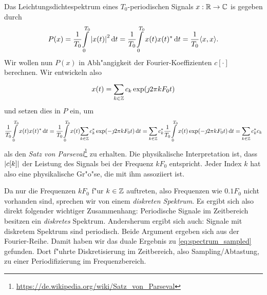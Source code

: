 Das Leichtungsdichtespektrum eines $T_0$-periodischen Signals $x: \mathbb{R} \rightarrow \mathbb{C}$ is gegeben durch
\begin{equation}\label{eq:fourier:period_psd}
P(x) = \frac{1}{T_0}{\int\limits_{0}^{T_0}{{\left| x(t) \right|}^2}\,\mathrm{d}{t}}
     = \frac{1}{T_0}{\int\limits_{0}^{T_0}{x(t) x(t)^\ast}\,\mathrm{d}{t}}
     = \frac{1}{T_0} {\left\langle x,x \right\rangle}.
\end{equation}
Wir wollen nun $P(x)$ in Abh"angigkeit der Fourier-Koeffizienten $c[\cdot]$ berechnen.
Wir entwickeln also
\[
x(t) = {\sum\limits_{k \in \mathbb{Z}}^{}{
    c_k \exp(\jmath 2 \pi k F_0 t)
}}
\]
und setzen dies in $P$ ein, um
\[
\frac{1}{T_0}{\int\limits_{0}^{T_0}{x(t) x(t)^\ast}\,\mathrm{d}{t}}
    = \frac{1}{T_0}{\int\limits_{0}^{T_0}{
        x(t) 
        {\sum\limits_{k \in \mathbb{Z}}^{}{
            c_k^\ast \exp(-\jmath 2 \pi k F_0 t)
        }}
    }\,\mathrm{d}{t}}
    = {\sum\limits_{k \in \mathbb{Z}}^{}{
        c_k^\ast 
        \frac{1}{T_0}{\int\limits_{0}^{T_0}{
            x(t)
            \exp(-\jmath 2 \pi k F_0 t)
        }\,\mathrm{d}{t}}
    }}
    = {\sum\limits_{k \in \mathbb{Z}}^{}{
        c_k^\ast c_k
    }}
\]
als den \emph{Satz von Parseval}\footnote{\url{https://de.wikipedia.org/wiki/Satz\_von\_Parseval}} zu erhalten.
Die physikalische Interpretation ist, dass ${\left| c[k] \right|}$ der Leistung des Signals bei der Frequenz $k F_0$ entspricht.
Jeder Index $k$ hat also eine physikalische Gr"o"se, die mit ihm assoziiert ist.

Da nur die Frequenzen $k F_0$ f"ur $k \in \mathbb{Z}$ auftreten, also Frequenzen wie $0.1 F_0$ nicht vorhanden sind, sprechen wir von einem \emph{diskreten Spektrum}.
Es ergibt sich also direkt folgender wichtiger Zusammenhang: Periodische Signale im Zeitbereich besitzen ein \emph{diskretes} Spektrum.
Andersherum ergibt sich auch: Signale mit diskretem Spektrum sind periodisch.
Beide Argument ergeben sich aus der Fourier-Reihe.
Damit haben wir das duale Ergebnis zu \eqref{eq:spectrum_sampled} gefunden.
Dort f"uhrte Diskretisierung im Zeitbereich, also Sampling/Abtastung, zu einer Periodifizierung im Frequenzbereich.

